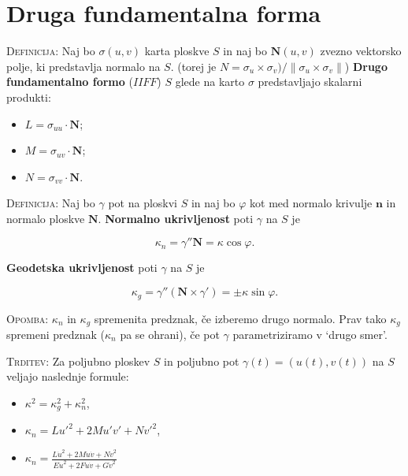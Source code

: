 \documentclass[8pt,a4paper]{amsart}
\theoremstyle{definition} %
\theoremstyle{plain} %
\begin{document}
\thispagestyle{empty}
\setlength{\parindent}{0pt}
\section*{\textbf{Druga fundamentalna forma}} %

\textsc{Definicija: }Naj bo $\sigma (u,v)$ karta ploskve $S$ in naj bo $\textbf{N}(u,v)$ zvezno vektorsko polje, ki predstavlja normalo na $S$. (torej je $N = \sigma _u \times \sigma _v)/\| \sigma _u \times \sigma _v \|$) \textbf{Drugo fundamentalno formo} ($IIFF$) $S$ glede na karto $\sigma $ predstavljajo skalarni produkti:

\begin{itemize}

\item $L=\sigma _{uu} \cdot \textbf{N}$;

\item $M=\sigma _{uv} \cdot \textbf{N}$;

\item $N=\sigma _{vv} \cdot \textbf{N}$.

\end{itemize}



\textsc{Definicija: }Naj bo $\gamma$ pot na ploskvi $S$ in naj bo $\varphi $ kot med normalo krivulje $\textbf{n}$ in normalo ploskve $\textbf{N}$. \textbf{Normalno ukrivljenost} poti $\gamma$ na $S$ je

$$
\kappa_n = \gamma ''\textbf{N} = \kappa \cos \varphi .
$$

\textbf{Geodetska ukrivljenost }poti $\gamma$ na $S$ je

$$
\kappa_g = \gamma ''(\textbf{N} \times \gamma ')=\pm \kappa \sin \varphi .
$$

\textsc{Opomba: }$\kappa_n$ in $\kappa_g$ spremenita predznak, če izberemo drugo normalo. Prav tako $\kappa_g$ spremeni predznak ($\kappa_n$ pa se ohrani), če pot $\gamma$ parametriziramo v `drugo smer'.

\textsc{Trditev: }Za poljubno ploskev $S$ in poljubno pot $\gamma (t)=(u(t),v(t))$ na $S$ veljajo naslednje formule:
\begin{itemize}
\item $\kappa ^2 = \kappa _g^2+\kappa_n^2$,
\item $\kappa_n = Lu'^2+2Mu'v'+Nv'^2$,
\item $\kappa_n=\frac{L\dot{u}^2+2M\dot{u}\dot{v}+N\dot{v}^2}{E\dot{u}^2+2F\dot{u}\dot{v}+G\dot{v}^2}$
\end{itemize}
\end{document}

